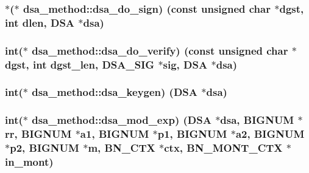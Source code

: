 \subsubsection[{\texorpdfstring{dsa\+\_\+do\+\_\+sign}{dsa_do_sign}}]{$\ast$($\ast$ dsa\+\_\+method\+::dsa\+\_\+do\+\_\+sign) (const unsigned char $\ast$dgst, int dlen, {\bf D\+SA} $\ast$dsa)}\hypertarget{structdsa__method_acac9dacfe7fd6637af11f0280ed087ad}{}\label{structdsa__method_acac9dacfe7fd6637af11f0280ed087ad}
\subsubsection[{\texorpdfstring{dsa\+\_\+do\+\_\+verify}{dsa_do_verify}}]{\setlength{\rightskip}{0pt plus 5cm}int($\ast$ dsa\+\_\+method\+::dsa\+\_\+do\+\_\+verify) (const unsigned char $\ast$dgst, int dgst\+\_\+len, {\bf D\+S\+A\+\_\+\+S\+IG} $\ast$sig, {\bf D\+SA} $\ast$dsa)}\hypertarget{structdsa__method_a48d8dcf12cd14676633cde4b06dbe1c5}{}\label{structdsa__method_a48d8dcf12cd14676633cde4b06dbe1c5}
\subsubsection[{\texorpdfstring{dsa\+\_\+keygen}{dsa_keygen}}]{\setlength{\rightskip}{0pt plus 5cm}int($\ast$ dsa\+\_\+method\+::dsa\+\_\+keygen) ({\bf D\+SA} $\ast$dsa)}\hypertarget{structdsa__method_a55bf9cc2d75b43788806388a6e924eb1}{}\label{structdsa__method_a55bf9cc2d75b43788806388a6e924eb1}
\subsubsection[{\texorpdfstring{dsa\+\_\+mod\+\_\+exp}{dsa_mod_exp}}]{\setlength{\rightskip}{0pt plus 5cm}int($\ast$ dsa\+\_\+method\+::dsa\+\_\+mod\+\_\+exp) ({\bf D\+SA} $\ast$dsa, {\bf B\+I\+G\+N\+UM} $\ast$rr, {\bf B\+I\+G\+N\+UM} $\ast$a1, {\bf B\+I\+G\+N\+UM} $\ast$p1, {\bf B\+I\+G\+N\+UM} $\ast$a2, {\bf B\+I\+G\+N\+UM} $\ast$p2, {\bf B\+I\+G\+N\+UM} $\ast$m, {\bf B\+N\+\_\+\+C\+TX} $\ast$ctx, {\bf B\+N\+\_\+\+M\+O\+N\+T\+\_\+\+C\+TX} $\ast$in\+\_\+mont)}\hypertarget{structdsa__method_a6295bfda1f4be2fc9e04e69c6a104f4d}{}\label{structdsa__method_a6295bfda1f4be2fc9e04e69c6a104f4d}
